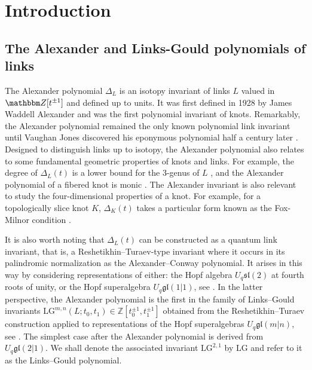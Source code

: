 \documentclass[12pt,reqno]{amsart}
\theoremstyle{definition}
\def\BZ{\mathbbm Z}
\newcommand{\slt}{{\mathfrak{sl}(2)}}
\def\LG{\mathrm{LG}}
\newcommand{\gl}{\ensuremath{\mathfrak{gl}}}
\begin{document}
{\footnotesize
\tableofcontents
}


\section{Introduction}

\subsection{The Alexander and Links-Gould polynomials of links}

The Alexander polynomial $\Delta_L$ is an isotopy invariant of links $L$ valued in $\BZ[t^{\pm1}]$ and defined up to units. It was first defined in 1928 by James Waddell Alexander \cite{Alexander28} and was the first polynomial invariant of knots. Remarkably, the Alexander polynomial remained the only known polynomial link invariant until Vaughan Jones discovered his eponymous polynomial half a century later \cite{Jones85}. Designed to distinguish links up to isotopy, the Alexander polynomial also relates to some fundamental geometric properties of knots and links. For example, the degree of $\Delta_L(t)$ is a lower bound for the 3-genus of $L$ \cite{Seifert35}, and the Alexander polynomial of a fibered knot is monic \cite{Neuwirth65, Rapaport60, Stallings62}. The Alexander invariant is also relevant to study the four-dimensional properties of a knot. For example, for a topologically slice knot $K$, $\Delta_K(t)$ takes a particular form known as the Fox-Milnor condition \cite{FM66}. 


It is also worth noting that $\Delta_L(t)$ can be constructed as a quantum link invariant, that is, a Reshetikhin--Turaev-type invariant where it occurs in its palindromic normalization as the Alexander--Conway polynomial. It arises in this way by considering representations of either: the Hopf algebra $U_q\slt$ at fourth roots of unity, or the Hopf superalgebra $U_q\gl(1|1)$, see \cite{murakami2006multi, Viro07}. In the latter perspective, the Alexander polynomial is the first in the family of Links--Gould invariants $\LG^{m,n}(L;t_{0},t_{1}) \in \mathbb{Z}[t_0^{\pm 1} , t_1^{\pm 1}]$ obtained from the Reshetikhin--Turaev construction applied to representations of the Hopf superalgebras $U_{q}\mathfrak{gl}(m \vert n)$, see \cite{Links-Gould, DWKL, DW01}. The simplest case after the Alexander polynomial is derived from $U_{q}\mathfrak{gl}(2 \vert 1)$. We shall denote the associated invariant $\LG^{2,1}$ by $\LG$ and refer to it as the Links--Gould polynomial. 
\end{document}
